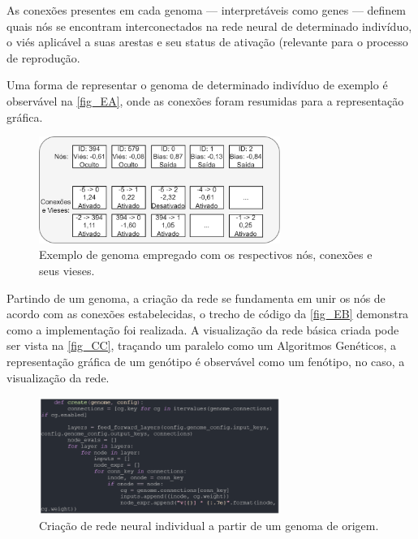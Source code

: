 As conexões presentes em cada genoma — interpretáveis como genes — definem quais nós se encontram interconectados na rede neural de determinado indivíduo, o viés aplicável a suas arestas e seu status de ativação (relevante para o processo de reprodução.

Uma forma de representar o genoma de determinado indivíduo de exemplo é observável na \autoref{fig_EA}, onde as conexões foram resumidas para a representação gráfica.

\begin{figure}[htb]
        \centering
        \caption{\label{fig_EA}Exemplo de genoma empregado com os respectivos nós, conexões e seus vieses.}
        \includegraphics[width=0.7\textwidth]{images/EA.png}
\end{figure}

Partindo de um genoma, a criação da rede se fundamenta em unir os nós de acordo com as conexões estabelecidas, o trecho de código da \autoref{fig_EB} demonstra como a implementação foi realizada. A visualização da rede básica criada pode ser vista na \autoref{fig_CC}, traçando um paralelo como um Algoritmos Genéticos, a representação gráfica de um genótipo é observável como um fenótipo, no caso, a visualização da rede.

\begin{figure}[htb]
        \centering
        \caption{\label{fig_EB}Criação de rede neural individual a partir de um genoma de origem.}
        \includegraphics[width=0.7\textwidth]{images/EB.png}
\end{figure}

